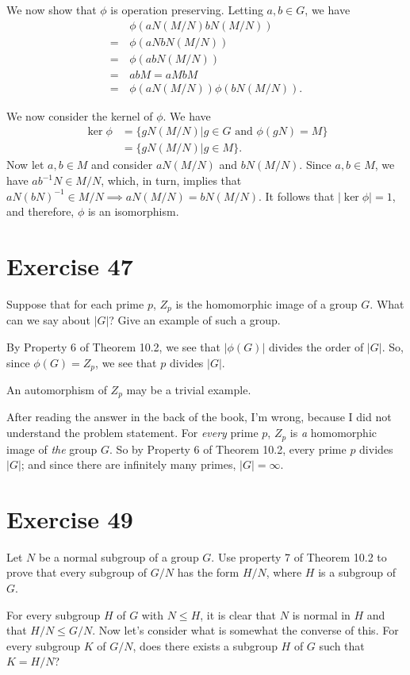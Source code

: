 \documentclass[12pt]{article}
\begin{document}
We now show that $\phi$ is operation preserving.  Letting $a,b\in G$, we have
\begin{align*}
 & \phi(aN(M/N)bN(M/N)) \\
 =\,& \phi(aNbN(M/N)) \\
 =\,& \phi(abN(M/N)) \\
 =\,& abM = aMbM \\
 =\,& \phi(aN(M/N))\phi(bN(M/N)).
\end{align*}

We now consider the kernel of $\phi$.  We have
\begin{align*}
\ker\phi &=\{gN(M/N)|\mbox{$g\in G$ and $\phi(gN)=M$}\} \\
 &= \{gN(M/N)|g\in M\}.
\end{align*}
Now let $a,b\in M$ and consider $aN(M/N)$ and $bN(M/N)$.
Since $a,b\in M$, we have $ab^{-1}N\in M/N$,
which, in turn, implies that $aN(bN)^{-1}\in M/N\implies aN(M/N)=bN(M/N)$.
It follows that $|\ker\phi|=1$, and therefore, $\phi$ is an isomorphism.

\section*{Exercise 47}

Suppose that for each prime $p$, $Z_p$ is the homomorphic image of a group $G$.
What can we say about $|G|$?  Give an example of such a group.

By Property 6 of Theorem 10.2, we see that $|\phi(G)|$ divides the order of $|G|$.
So, since $\phi(G)=Z_p$, we see that $p$ divides $|G|$.

An automorphism of $Z_p$ may be a trivial example.

After reading the answer in the back of the book, I'm wrong, because I did not understand
the problem statement.  For {\it every} prime $p$, $Z_p$ is {\it a} homomorphic image of {\it the}
group $G$.  So by Property 6 of Theorem 10.2, every prime $p$ divides $|G|$; and since
there are infinitely many primes, $|G|=\infty$.

\section*{Exercise 49}

Let $N$ be a normal subgroup of a group $G$.  Use property 7 of Theorem 10.2
to prove that every subgroup of $G/N$ has the form $H/N$, where $H$ is a subgroup
of $G$.

For every subgroup $H$ of $G$ with $N\leq H$, it is clear that $N$ is normal in $H$
and that $H/N\leq G/N$.  Now let's consider what is somewhat the converse of this.
For every subgroup $K$ of $G/N$, does there exists a subgroup $H$ of $G$
such that $K=H/N$?
\end{document}
